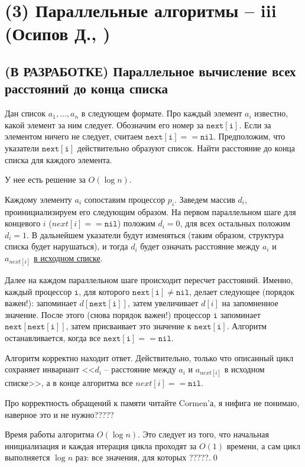 \section{(3) Параллельные алгоритмы -- iii (Осипов Д., \groth)}
\newcommand{\nxt}[1] {\mathtt{next[#1]}}
\newcommand{\nil} {\mathtt{nil}}
\subsection{(В РАЗРАБОТКЕ) Параллельное вычисление всех расстояний до конца списка}
\begin{problem*}
Дан список $a_1, \ldots, a_n$  в следующем формате. Про каждый элемент $a_i$ известно, какой элемент за ним следует. Обозначим его номер за $\nxt{i}$. Если за элементом ничего не следует, считаем $\nxt{i} == \nil$. Предположим, что указатели $\nxt{i}$ действительно образуют список. Найти расстояние до конца списка для каждого элемента.
\end{problem*}
У нее есть решение за $O(\log n)$.

Каждому элементу $a_i$ сопоставим процессор $p_i$. Заведем массив $d_i$, проинициализируем его следующим образом. На первом параллельном шаге для концевого $i$ ($next[i]==\nil$) положим $d_i = 0$, для всех остальных положим $d_i = 1$. В дальнейшем указатели будут изменяться (таким образом, структура списка будет нарушаться), и тогда $d_i$ будет означать расстояние между $a_i$ и $a_{next[i]}$ \underline{в исходном списке}.

Далее на каждом параллельном шаге происходит пересчет расстояний. Именно, каждый процессор $\mathtt i$, для которого $\nxt{i} \neq \nil$, делает следующее (порядок важен!): запоминает $d[\nxt{i}]$, затем увеличивает $d[i]$ на запомненное значение. После этого (снова порядок важен!) процессор $\mathtt i$ запоминает $\nxt{\nxt{i}}$, затем присваивает это значение к $\nxt{i}$. Алгоритм останавливается, когда все $\nxt{i} == \nil$.

Алгоритм корректно находит ответ. Действительно, только что описанный цикл сохраняет инвариант <<$d_i$ -- расстояние между $a_i$ и $a_{next[i]}$ в исходном списке>>, а в конце алгоритма все $next[i] == \nil$. 

Про корректность обращений к памяти читайте Cormen'а, я нифига не понимаю, наверное это и не нужно?????

Время работы алгоритма $O(\log n)$. Это следует из того, что начальная инициализация и каждая итерация цикла проходят за $O(1)$ времени, а сам цикл выполняется $\log n$ раз: все значения, для которых ?????.\qed


